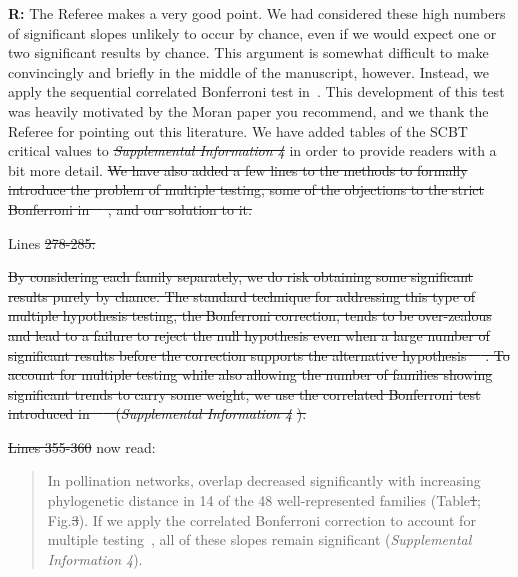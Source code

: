 \documentclass[12pt]{letter}
\providecommand{\DIFadd}[1]{{\protect\color{blue}\uwave{#1}}} %
\providecommand{\DIFdel}[1]{{\protect\color{red}\sout{#1}}}                      %
\providecommand{\DIFaddbegin}{} %
\providecommand{\DIFaddend}{} %
\providecommand{\DIFdelbegin}{} %
\providecommand{\DIFdelend}{} %
\newcommand{\DIFscaledelfig}{0.5}
\newlength{\DIFdelgraphicswidth} %
\newlength{\DIFdelgraphicsheight} %
\newcommand{\DIFaddincludegraphics}[2][]{{\color{blue}\fbox{\DIFOincludegraphics[#1]{#2}}}} %
\newcommand{\DIFdelincludegraphics}[2][]{%
\sbox{\DIFdelgraphicsbox}{\DIFOincludegraphics[#1]{#2}}%
\settoboxwidth{\DIFdelgraphicswidth}{\DIFdelgraphicsbox} %
\settoboxtotalheight{\DIFdelgraphicsheight}{\DIFdelgraphicsbox} %
\scalebox{\DIFscaledelfig}{%
\parbox[b]{\DIFdelgraphicswidth}{\usebox{\DIFdelgraphicsbox}\\[-\baselineskip] \rule{\DIFdelgraphicswidth}{0em}}\llap{\resizebox{\DIFdelgraphicswidth}{\DIFdelgraphicsheight}{%
\setlength{\unitlength}{\DIFdelgraphicswidth}%
\begin{picture}(1,1)%
\thicklines\linethickness{2pt} %
{\color[rgb]{1,0,0}\put(0,0){\framebox(1,1){}}}%
{\color[rgb]{1,0,0}\put(0,0){\line( 1,1){1}}}%
{\color[rgb]{1,0,0}\put(0,1){\line(1,-1){1}}}%
\end{picture}%
}\hspace*{3pt}}} %
} %
\DeclareRobustCommand{\DIFaddbegin}{\DIFOaddbegin \let\includegraphics\DIFaddincludegraphics} %
\DeclareRobustCommand{\DIFaddend}{\DIFOaddend \let\includegraphics\DIFOincludegraphics} %
\DeclareRobustCommand{\DIFdelbegin}{\DIFOdelbegin \let\includegraphics\DIFdelincludegraphics} %
\DeclareRobustCommand{\DIFdelend}{\DIFOaddend \let\includegraphics\DIFOincludegraphics} %
\begin{document}
	\textbf{R:} The Referee makes a very good point. We had considered these high numbers of significant slopes unlikely to occur by chance, even if we would expect one or two significant results by chance. This argument is somewhat difficult to make convincingly and briefly in the middle of the manuscript, however. Instead, we apply the sequential correlated Bonferroni test in~\citet{Drezner2016}. This development of this test was heavily motivated by the Moran paper you recommend, and we thank the Referee for pointing out this literature. We have added tables of the SCBT critical values to \DIFdelbegin \emph{\DIFdel{Supplemental Information 4}} %
\DIFdelend \DIFaddbegin \DIFadd{Supplemental Information 4 }\DIFaddend in order to provide readers with a bit more detail.
\DIFdelbegin \DIFdel{We have also added a few lines to the methods to formally introduce the problem of multiple testing, some of the objections to the strict Bonferroni in~\mbox{%
\citet{Moran2003}}\hspace{0pt}%
, and our solution to it.
}\DIFdelend 


	Lines \DIFdelbegin \DIFdel{278-285:
}%


\DIFdel{By considering each family separately, we do risk obtaining some significant results purely by chance. The standard technique for addressing this type of multiple hypothesis testing, the Bonferroni correction, tends to be over-zealous and lead to a failure to reject the null hypothesis even when a large number of significant results before the correction supports the alternative hypothesis~\mbox{%
\citep{Moran2003}}\hspace{0pt}%
. To account for multiple testing while also allowing the number of families showing significant trends to carry some weight, we use the correlated Bonferroni test introduced in~\mbox{%
\citet{Drezner2016} }\hspace{0pt}%
(}\emph{\DIFdel{Supplemental Information 4}}%
\DIFdel{).
}%


\DIFdel{Lines 355-360 }\DIFdelend \DIFaddbegin \DIFadd{XX-XX }\DIFaddend now read:

	\begin{quotation}
		 In pollination networks, overlap decreased significantly with increasing phylogenetic distance in 14 of the 48 well-represented families (Table\DIFdelbegin \DIFdel{1}\DIFdelend \DIFaddbegin \DIFadd{~\ref{family_slopes_pp}}\DIFaddend ; Fig.\DIFdelbegin \DIFdel{3}\DIFdelend \DIFaddbegin \DIFadd{~\ref{within_family_regression}}\DIFaddend ). If we apply the correlated Bonferroni correction to account for multiple testing~\citep{Drezner2016}, all of these slopes remain significant (\emph{Supplemental Information 4}).
	\end{quotation}
\end{document}
